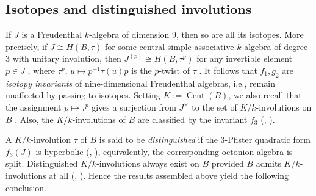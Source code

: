 \documentclass{amsart}
\theoremstyle{definition} %
\theoremstyle{remark} %
\DeclareMathOperator{\Cent}{Cent}
\renewcommand{\:}{\colon\,}
\numberwithin{equation}{section}
\begin{document}
\subsection{Isotopes and distinguished involutions} \label{ss.ISDINV} If $J$ is a Freudenthal $k$-algebra of dimension $9$, then so are all its isotopes. More precisely,  if $J \cong H(B,\tau)$ for some central simple associative $k$-algebra of degree $3$ with unitary involution, then $J^{(p)} \cong H(B,\tau^p)$ for any invertible element $p \in J$ \cite[31.15]{MR4806163}, where $\tau^p$, $u \mapsto p^{-1}\tau(u)p$ is the $p$-twist of $\tau$ \cite[10.8]{MR4806163}. It follows that $f_1,g_2$ are \emph{isotopy invariants} of nine-dimensional Freudenthal algebras, i.e., remain unaffected by passing to isotopes. Setting $K := \Cent(B)$, we also recall that the assignment $p \mapsto \tau^p$ gives a surjection from $J^\times$ to the set of $K/k$-involutions on $B$ \cite[Thm.~8.7.4]{MR770063}. Also, the $K/k$-involutions of $B$ are classified by the invariant $f_3$ (\cite[Thm.~(19.6)]{MR1632779}, \cite[Thm.~2.4]{MR2063796}).

A $K/k$-involution $\tau$ of $B$ is said to be \emph{distinguished} if the $3$-Pfister quadratic form $f_3(J)$ is hyperbolic (\cite[(19.8)]{MR1632779}, \cite[2.6]{MR2063796}), equivalently, the corresponding octonion algebra is split. Distinguished $K/k$-involutions always exist on $B$ provided $B$ admits $K/k$-involutions at all (\cite[(19.12)]{MR1632779}, \cite[Thm.~2.10]{MR2063796}). Hence the results assembled above yield the following conclusion.
\end{document}
